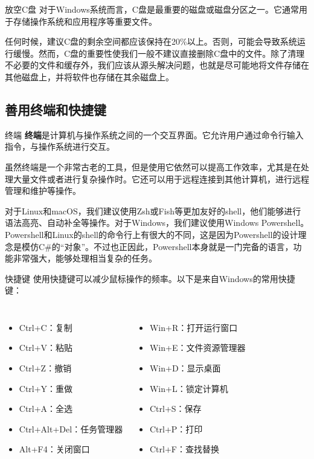 \documentclass{beamer}
\begin{document}
\begin{frame}{放空C盘}
    对于Windows系统而言，C盘是最重要的磁盘或磁盘分区之一。它通常用于存储操作系统和应用程序等重要文件。

    任何时候，建议C盘的剩余空间都应该保持在20\%以上。否则，可能会导致系统运行缓慢。然而，C盘的重要性使我们一般不建议直接删除C盘中的文件。除了清理不必要的文件和缓存外，我们应该从源头解决问题，也就是尽可能地将文件存储在其他磁盘上，并将软件也存储在其余磁盘上。
\end{frame}
\subsection{善用终端和快捷键}

\begin{frame}{终端}
    \textbf{终端}是计算机与操作系统之间的一个交互界面。它允许用户通过命令行输入指令，与操作系统进行交互。

    虽然终端是一个非常古老的工具，但是使用它依然可以提高工作效率，尤其是在处理大量文件或者进行复杂操作时。它还可以用于远程连接到其他计算机，进行远程管理和维护等操作。

    对于Linux和macOS，我们建议使用Zsh或Fish等更加友好的shell，他们能够进行语法高亮、自动补全等操作。对于Windows，我们建议使用Windows Powershell。Powershell和Linux的shell的命令行上有很大的不同，这是因为Powershell的设计理念是模仿C\#的“对象”。不过也正因此，Powershell本身就是一门完备的语言，功能非常强大，能够处理相当复杂的任务。
    
\end{frame}

\begin{frame}{快捷键}
    使用快捷键可以减少鼠标操作的频率。以下是来自Windows的常用快捷键：
    \begin{columns}[T]
            \begin{itemize}
                \item Ctrl+C：复制
                \item Ctrl+V：粘贴
                \item Ctrl+Z：撤销
                \item Ctrl+Y：重做
                \item Ctrl+A：全选
                \item Ctrl+Alt+Del：任务管理器
                \item Alt+F4：关闭窗口
            \end{itemize}

            \begin{itemize}
                \item Win+R：打开运行窗口
                \item Win+E：文件资源管理器
                \item Win+D：显示桌面
                \item Win+L：锁定计算机
                \item Ctrl+S：保存
                \item Ctrl+P：打印
                \item Ctrl+F：查找替换
            \end{itemize}
    \end{columns}
\end{frame}
\end{document}
